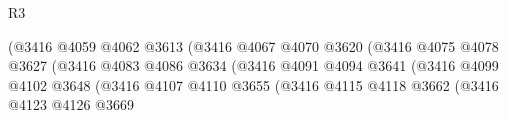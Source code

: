\begin{lexlean}{R3}
\begin{coremodule}
                                                          (@3416
                                                            @4059
                                                            @4062
                                                            @3613
                                                            (@3416
                                                              @4067
                                                              @4070
                                                              @3620
                                                              (@3416
                                                                @4075
                                                                @4078
                                                                @3627
                                                                (@3416
                                                                  @4083
                                                                  @4086
                                                                  @3634
                                                                  (@3416
                                                                    @4091
                                                                    @4094
                                                                    @3641
                                                                    (@3416
                                                                      @4099
                                                                      @4102
                                                                      @3648
                                                                      (@3416
                                                                        @4107
                                                                        @4110
                                                                        @3655
                                                                        (@3416
                                                                          @4115
                                                                          @4118
                                                                          @3662
                                                                          (@3416
                                                                            @4123
                                                                            @4126
                                                                            @3669

\end{coremodule}
\end{lexlean}
